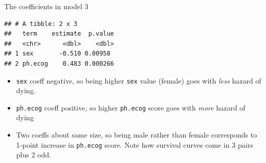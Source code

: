 \documentclass[ignorenonframetext,]{beamer}
\newenvironment{Shaded}{\begin{snugshade}}{\end{snugshade}}
\newcommand{\FloatTok}[1]{\textcolor[rgb]{0.00,0.00,0.81}{#1}}
\newcommand{\KeywordTok}[1]{\textcolor[rgb]{0.13,0.29,0.53}{\textbf{#1}}}
\newcommand{\NormalTok}[1]{#1}
\newcommand{\OperatorTok}[1]{\textcolor[rgb]{0.81,0.36,0.00}{\textbf{#1}}}
\newcommand{\StringTok}[1]{\textcolor[rgb]{0.31,0.60,0.02}{#1}}
\begin{document}
\begin{frame}[fragile]{The coefficients in model 3}
\protect\hypertarget{the-coefficients-in-model-3}{}

\begin{Shaded}
\end{Shaded}

\begin{verbatim}
## # A tibble: 2 x 3
##   term    estimate  p.value
##   <chr>      <dbl>    <dbl>
## 1 sex       -0.510 0.00958 
## 2 ph.ecog    0.483 0.000266
\end{verbatim}

\begin{itemize}
\item
  \texttt{sex} coeff negative, so being higher \texttt{sex} value
  (female) goes with \emph{less} hazard of dying.
\item
  \texttt{ph.ecog} coeff positive, so higher \texttt{ph.ecog} score goes
  with \emph{more} hazard of dying
\item
  Two coeffs about same size, so being male rather than female
  corresponds to 1-point increase in \texttt{ph.ecog} score. Note how
  survival curves come in 3 pairs plus 2 odd.
\end{itemize}

\end{frame}
\end{document}

